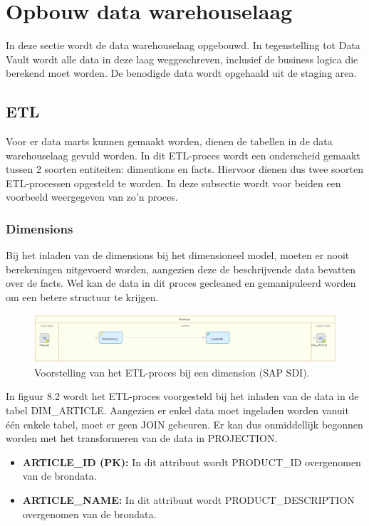 \section{Opbouw data warehouselaag}
In deze sectie wordt de data warehouselaag opgebouwd. In tegenstelling tot Data Vault wordt alle data in deze laag weggeschreven, inclusief de business logica die berekend moet worden. De benodigde data wordt opgehaald uit de staging area.
\subsection{ETL}
Voor er data marts kunnen gemaakt worden, dienen de tabellen in de data warehouselaag gevuld worden. In dit ETL-proces wordt een onderscheid gemaakt tussen 2 soorten entiteiten: dimentions en facts. Hiervoor dienen dus twee soorten ETL-processen opgesteld te worden. In deze subsectie wordt voor beiden een voorbeeld weergegeven van zo'n proces.

\subsubsection{Dimensions}
Bij het inladen van de dimensions bij het dimensioneel model, moeten er nooit berekeningen uitgevoerd worden, aangezien deze de beschrijvende data bevatten over de facts. Wel kan de data in dit proces gecleaned en gemanipuleerd worden om een betere structuur te krijgen. 

\begin{figure}[h]
	\centering
	\includegraphics[scale=0.5]{../images/DM_FG_dim.png}
	\caption{Voorstelling van het ETL-proces bij een dimension (SAP SDI).}
	\label{fig:DM_FG_dim}
\end{figure}

In figuur 8.2 wordt het ETL-proces voorgesteld bij het inladen van de data in de tabel DIM\_ARTICLE. Aangezien er enkel data moet ingeladen worden vanuit één enkele tabel, moet er geen JOIN gebeuren. Er kan dus onmiddellijk begonnen worden met het transformeren van de data in PROJECTION. 

\begin{itemize}
	\item \textbf{ARTICLE\_ID (PK):} In dit attribuut wordt PRODUCT\_ID overgenomen van de brondata.
	\item \textbf{ARTICLE\_NAME:} In dit attribuut wordt PRODUCT\_DESCRIPTION overgenomen van de brondata.
\end{itemize} 


